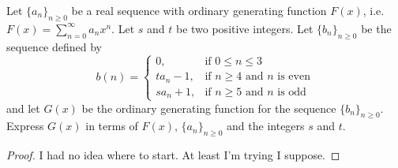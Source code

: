 \documentclass[12pt]{article}
\newenvironment{problem}[2][Problem]{\begin{trivlist}
\item[\hskip \labelsep {\bfseries #1}\hskip \labelsep {\bfseries #2.}]}{\end{trivlist}}
\begin{document}
\begin{problem}{4}
Let $\{a_n\}_{n\geq 0}$ be a real sequence with ordinary generating function $F(x)$, i.e. $F(x)=\sum_{n=0}^{\infty}a_nx^n$. Let $s$ and $t$ be two positive integers. Let $\{b_n\}_{n\geq 0}$ be the sequence defined by 
$$b(n)=\left\{
	\begin{array}{ll}
	0, & \mbox {if } 0\leq n\leq 3 \\
	ta_{n}-1,  & \mbox {if } n\geq 4 \mbox{ and } n \mbox{ is even} \\
	sa_{n}+1, & \mbox {if } n\geq 5 \mbox{ and } n \mbox{ is odd}
	\end{array}
	\right.$$
and let $G(x)$ be the ordinary generating function for the sequence $\{b_n\}_{n\geq 0}$. Express $G(x)$ in terms of $F(x)$, $\{a_n\}_{n\geq 0}$ and the integers $s$ and $t$.\\
\end{problem}

\begin{proof} 
I had no idea where to start. At least I'm trying I suppose.
\end{proof}



\end{document}
